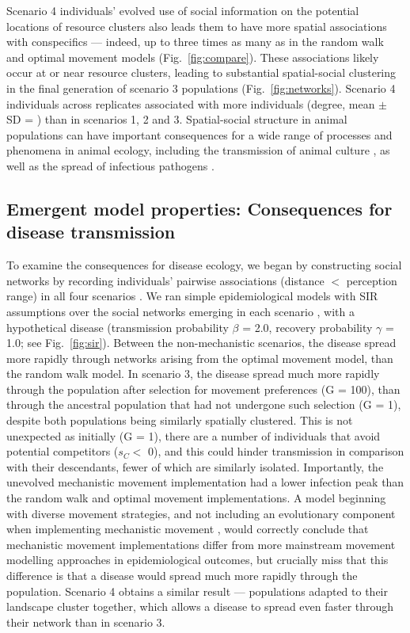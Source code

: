 Scenario 4 individuals' evolved use of social information on the potential locations of resource clusters also leads them to have more spatial associations with conspecifics --- indeed, up to three times as many as in the random walk and optimal movement models (Fig.~\ref{fig:compare}).
These associations likely occur at or near resource clusters, leading to substantial spatial-social clustering in the final generation of scenario 3 populations (Fig.~\ref{fig:networks}).
Scenario 4 individuals across replicates associated with more individuals (degree, mean $\pm$ SD = ) than in scenarios 1, 2 and 3.
Spatial-social structure in animal populations can have important consequences for a wide range of processes and phenomena in animal ecology, including the transmission of animal culture \citep[such as foraging tactics or migration routes][]{romano2020,romano2021,jesmer2018,klump2021}, as well as the spread of infectious pathogens \citep{white2017,white2018,white2018b,webber2022,ezenwa2016,albery2020}.

\subsection*{Emergent model properties: Consequences for disease transmission}

To examine the consequences for disease ecology, we began by constructing social networks by recording individuals' pairwise associations (distance $<$ perception range) in all four scenarios \citep{farine2015}.
We ran simple epidemiological models with SIR assumptions over the social networks emerging in each scenario \citep[25 replicates per network; 1 network per scenario replicate][]{white2017,csardi2006,bailey1975}, with a hypothetical disease (transmission probability $\beta$ = 2.0, recovery probability $\gamma$ = 1.0; see Fig.~\ref{fig:sir}).
Between the non-mechanistic scenarios, the disease spread more rapidly through networks arising from the optimal movement model, than the random walk model.
In scenario 3, the disease spread much more rapidly through the population after selection for movement preferences (G = 100), than through the ancestral population that had not undergone such selection (G = 1), despite both populations being similarly spatially clustered.
This is not unexpected as initially (G = 1), there are a number of individuals that avoid potential competitors ($s_C <$ 0), and this could hinder transmission in comparison with their descendants, fewer of which are similarly isolated.
Importantly, the unevolved mechanistic movement implementation had a lower infection peak than the random walk and optimal movement implementations.
A model beginning with diverse movement strategies, and not including an evolutionary component when implementing mechanistic movement \citep[such as][]{white2018}, would correctly conclude that mechanistic movement implementations differ from more mainstream movement modelling approaches in epidemiological outcomes, but crucially miss that this difference is that a disease would spread much more rapidly through the population.
Scenario 4 obtains a similar result --- populations adapted to their landscape cluster together, which allows a disease to spread even faster through their network than in scenario 3.


